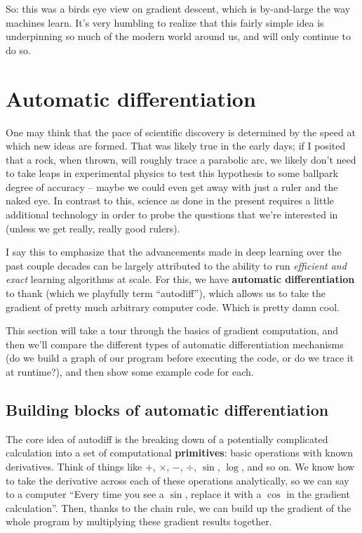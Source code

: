\documentclass[
  11pt,
  numbers=noendperiod]{book}
\begin{document}
So: this was a birds eye view on gradient descent, which is by-and-large the way machines learn. It's very humbling to realize that this fairly simple idea is underpinning so much of the modern world around us, and will only continue to do so.

\hypertarget{automatic-differentiation}{%
\chapter{Automatic differentiation}\label{automatic-differentiation}}

One may think that the pace of scientific discovery is determined by the
speed at which new ideas are formed. That was likely true in the early
days; if I posited that a rock, when thrown, will roughly trace a
parabolic arc, we likely don't need to take leaps in experimental
physics to test this hypothesis to some ballpark degree of accuracy --
maybe we could even get away with just a ruler and the naked eye. In
contrast to this, science as done in the present requires a little
additional technology in order to probe the questions that we're
interested in (unless we get really, really good rulers).

I say this to emphasize that the advancements made in deep learning over
the past couple decades can be largely attributed to the ability to run
\emph{efficient and exact} learning algorithms at scale. For this, we
have \textbf{automatic differentiation} to thank (which we playfully
term ``autodiff''), which allows us to take the gradient of pretty much
arbitrary computer code. Which is pretty damn cool.

This section will take a tour through the basics of gradient
computation, and then we'll compare the different types of automatic
differentiation mechanisms (do we build a graph of our program before
executing the code, or do we trace it at runtime?), and then show some
example code for each.

\hypertarget{building-blocks-of-automatic-differentiation}{%
\section{Building blocks of automatic
differentiation}\label{building-blocks-of-automatic-differentiation}}

The core idea of autodiff is the breaking down of a potentially
complicated calculation into a set of computational \textbf{primitives}:
basic operations with known derivatives. Think of things like \(+\),
\(\times\), \(-\), \(\div\), \(\sin\), \(\log\), and so on. We know how
to take the derivative across each of these operations analytically, so
we can say to a computer ``Every time you see a \(\sin\), replace it
with a \(\cos\) in the gradient calculation''. Then, thanks to the chain
rule, we can build up the gradient of the whole program by multiplying
these gradient results together.
\end{document}
